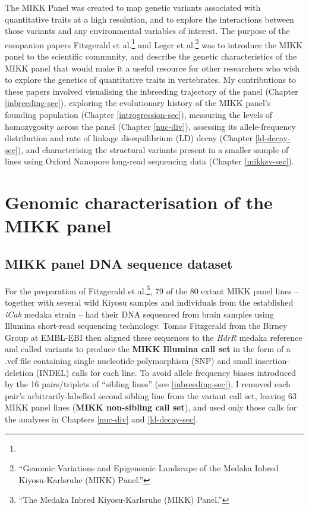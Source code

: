 \documentclass[
  9pt,
]{book}
\begin{document}
The MIKK Panel was created to map genetic variants associated with quantitative traits at a high resolution, and to explore the interactions between those variants and any environmental variables of interest. The purpose of the companion papers Fitzgerald et al.\footnote{} and Leger et al.\footnote{{``Genomic Variations and Epigenomic Landscape of the {Medaka Inbred Kiyosu-Karlsruhe} ({MIKK}) Panel.''}} was to introduce the MIKK panel to the scientific community, and describe the genetic characteristics of the MIKK panel that would make it a useful resource for other researchers who wish to explore the genetics of quantitative traits in vertebrates. My contributions to these papers involved visualising the inbreeding trajectory of the panel (Chapter \ref{inbreeding-sec}),
exploring the evolutionary history of the MIKK panel's founding population (Chapter \ref{introgression-sec}), measuring the levels of homozygosity across the panel (Chapter \ref{nuc-div}), assessing its allele-frequency distribution and rate of linkage disequilibrium (LD) decay (Chapter \ref{ld-decay-sec}), and characterising the structural variants present in a smaller sample of lines using Oxford Nanopore long-read sequencing data (Chapter \ref{mikksv-sec}).

\hypertarget{genomic-characterisation-of-the-mikk-panel}{%
\section{Genomic characterisation of the MIKK panel}\label{genomic-characterisation-of-the-mikk-panel}}

\hypertarget{non-sib-calls}{%
\subsection{MIKK panel DNA sequence dataset}\label{non-sib-calls}}

For the preparation of Fitzgerald et al.\footnote{{``The {Medaka Inbred Kiyosu-Karlsruhe} ({MIKK}) Panel.''}}, 79 of the 80 extant MIKK panel lines -- together with several wild Kiyosu samples and individuals from the established \emph{iCab} medaka strain -- had their DNA sequenced from brain samples using Illumina short-read sequencing technology. Tomas Fitzgerald from the Birney Group at EMBL-EBI then aligned these sequences to the \emph{HdrR} medaka reference and called variants to produce the \textbf{MIKK Illumina call set} in the form of a .vcf file containing single nucleotide polymorphism (SNP) and small insertion-deletion (INDEL) calls for each line. To avoid allele frequency biases introduced by the 16 pairs/triplets of ``sibling lines'' (see \ref{inbreeding-sec}), I removed each pair's arbitrarily-labelled second sibling line from the variant call set, leaving 63 MIKK panel lines (\textbf{MIKK non-sibling call set}), and used only those calls for the analyses in Chapters \ref{nuc-div} and \ref{ld-decay-sec}.
\end{document}

